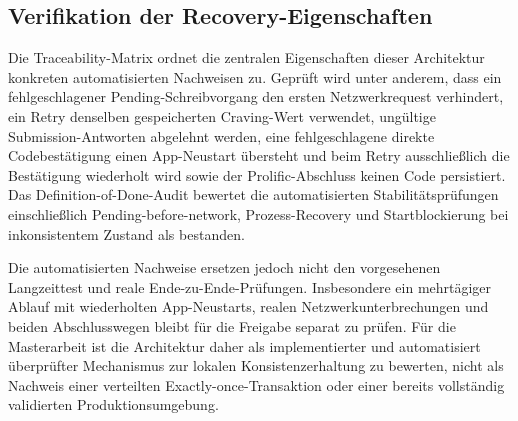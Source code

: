 \begin{neu}
\subsection{Verifikation der Recovery-Eigenschaften}

Die Traceability-Matrix ordnet die zentralen Eigenschaften dieser Architektur konkreten automatisierten Nachweisen zu. Geprüft wird unter anderem, dass ein fehlgeschlagener Pending-Schreibvorgang den ersten Netzwerkrequest verhindert, ein Retry denselben gespeicherten Craving-Wert verwendet, ungültige Submission-Antworten abgelehnt werden, eine fehlgeschlagene direkte Codebestätigung einen App-Neustart übersteht und beim Retry ausschließlich die Bestätigung wiederholt wird sowie der Prolific-Abschluss keinen Code persistiert. Das Definition-of-Done-Audit bewertet die automatisierten Stabilitätsprüfungen einschließlich Pending-before-network, Prozess-Recovery und Startblockierung bei inkonsistentem Zustand als bestanden.

Die automatisierten Nachweise ersetzen jedoch nicht den vorgesehenen Langzeittest und reale Ende-zu-Ende-Prüfungen. Insbesondere ein mehrtägiger Ablauf mit wiederholten App-Neustarts, realen Netzwerkunterbrechungen und beiden Abschlusswegen bleibt für die Freigabe separat zu prüfen. Für die Masterarbeit ist die Architektur daher als implementierter und automatisiert überprüfter Mechanismus zur lokalen Konsistenzerhaltung zu bewerten, nicht als Nachweis einer verteilten Exactly-once-Transaktion oder einer bereits vollständig validierten Produktionsumgebung.
\end{neu}
